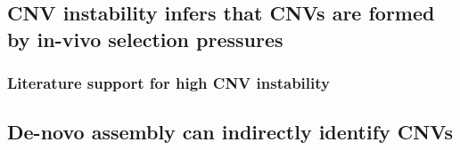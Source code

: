 \documentclass{article}
\begin{document}

 

\subsection{CNV instability infers that CNVs are formed by in-vivo selection pressures}

\subsubsection{Literature support for high CNV instability}










\subsection{De-novo assembly can indirectly identify CNVs}
\end{document}
